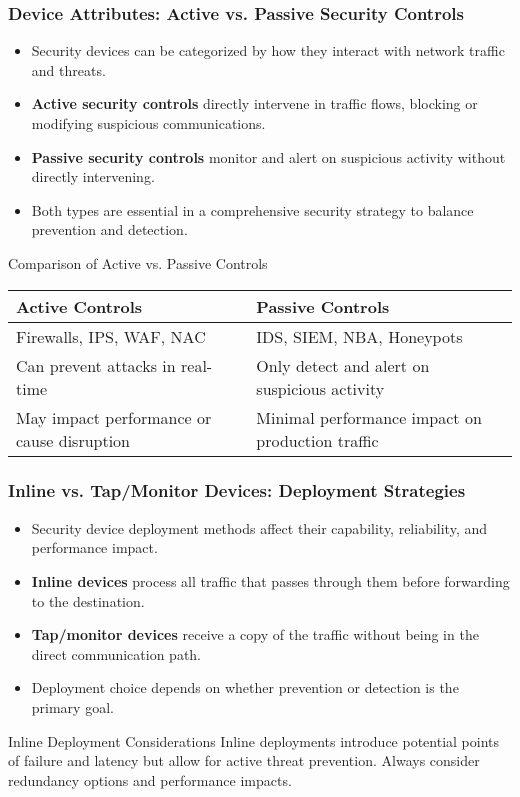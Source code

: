 \documentclass{beamer}
\begin{document}
\begin{frame}
    \frametitle{Device Attributes: Active vs. Passive Security Controls}
    \begin{itemize}
        \item Security devices can be categorized by how they interact with network traffic and threats.
        \item \textbf{Active security controls} directly intervene in traffic flows, blocking or modifying suspicious communications.
        \item \textbf{Passive security controls} monitor and alert on suspicious activity without directly intervening.
        \item Both types are essential in a comprehensive security strategy to balance prevention and detection.
    \end{itemize}
    
    \begin{block}{Comparison of Active vs. Passive Controls}
        \begin{tabular}{|p{}|p{}|}
            \hline
            \textbf{Active Controls} & \textbf{Passive Controls} \\
            \hline
            Firewalls, IPS, WAF, NAC & IDS, SIEM, NBA, Honeypots \\
            \hline
            Can prevent attacks in real-time & Only detect and alert on suspicious activity \\
            \hline
            May impact performance or cause disruption & Minimal performance impact on production traffic \\
            \hline
        \end{tabular}
    \end{block}
\end{frame}

\begin{frame}
    \frametitle{Inline vs. Tap/Monitor Devices: Deployment Strategies}
    \begin{itemize}
        \item Security device deployment methods affect their capability, reliability, and performance impact.
        \item \textbf{Inline devices} process all traffic that passes through them before forwarding to the destination.
        \item \textbf{Tap/monitor devices} receive a copy of the traffic without being in the direct communication path.
        \item Deployment choice depends on whether prevention or detection is the primary goal.
    \end{itemize}
    
    \begin{alertblock}{Inline Deployment Considerations}
        Inline deployments introduce potential points of failure and latency but allow for active threat prevention. Always consider redundancy options and performance impacts.
    \end{alertblock}
\end{frame}
\end{document}
